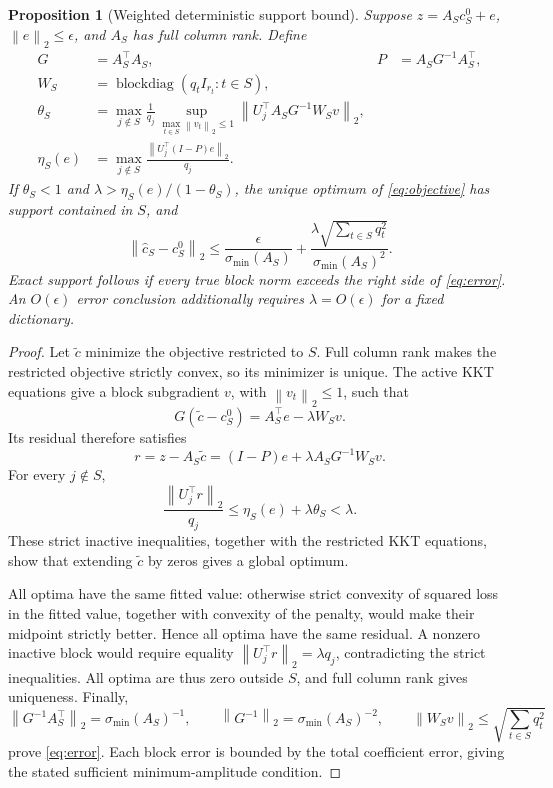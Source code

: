 \documentclass[11pt]{article}
\newtheorem{proposition}{Proposition}
\newcommand{\norm}[1]{\left\lVert#1\right\rVert}
\begin{document}
\newpage
\begin{proposition}[Weighted deterministic support bound]\label{prop:weighted}
Suppose $z=A_Sc_S^0+e$, $\norm{e}_2\leq\epsilon$, and $A_S$ has full column
rank. Define
\begin{align*}
 G&=A_S^\top A_S,& P&=A_SG^{-1}A_S^\top,\\
 W_S&=\operatorname{blockdiag}(q_tI_{r_t}:t\in S),\\
 \theta_S&=\max_{j\notin S}\frac1{q_j}
   \sup_{\max_{t\in S}\norm{v_t}_2\leq1}
     \norm{U_j^\top A_SG^{-1}W_Sv}_2,\\
 \eta_S(e)&=\max_{j\notin S}\frac{\norm{U_j^\top(I-P)e}_2}{q_j}.
\end{align*}
If $\theta_S<1$ and $\lambda>\eta_S(e)/(1-\theta_S)$, the unique optimum of
\eqref{eq:objective} has support contained in $S$, and
\begin{equation}\label{eq:error}
 \norm{\widehat c_S-c_S^0}_2
 \leq \frac{\epsilon}{\sigma_{\min}(A_S)}
 +\frac{\lambda\sqrt{\sum_{t\in S}q_t^2}}{\sigma_{\min}(A_S)^2}.
\end{equation}
Exact support follows if every true block norm exceeds the right side of
\eqref{eq:error}. An $O(\epsilon)$ error conclusion additionally requires
$\lambda=O(\epsilon)$ for a fixed dictionary.
\end{proposition}

\begin{proof}
Let $\widetilde c$ minimize the objective restricted to $S$. Full column rank
makes the restricted objective strictly convex, so its minimizer is unique.
The active KKT equations give a block subgradient $v$, with
$\norm{v_t}_2\leq1$, such that
\[
 G(\widetilde c-c_S^0)=A_S^\top e-\lambda W_Sv.
\]
Its residual therefore satisfies
\[
 r=z-A_S\widetilde c=(I-P)e+\lambda A_SG^{-1}W_Sv.
\]
For every $j\notin S$,
\[
 \frac{\norm{U_j^\top r}_2}{q_j}
 \leq\eta_S(e)+\lambda\theta_S<\lambda.
\]
These strict inactive inequalities, together with the restricted KKT equations,
show that extending $\widetilde c$ by zeros gives a global optimum.

All optima have the same fitted value: otherwise strict convexity of squared
loss in the fitted value, together with convexity of the penalty, would make
their midpoint strictly better. Hence all optima have the same residual.
A nonzero inactive block would require equality
$\norm{U_j^\top r}_2=\lambda q_j$, contradicting the strict inequalities.
All optima are thus zero outside $S$, and full column rank gives uniqueness.
Finally,
\[
 \norm{G^{-1}A_S^\top}_2=\sigma_{\min}(A_S)^{-1},\qquad
 \norm{G^{-1}}_2=\sigma_{\min}(A_S)^{-2},\qquad
 \norm{W_Sv}_2\leq\sqrt{\sum_{t\in S}q_t^2}
\]
prove \eqref{eq:error}. Each block error is bounded by the total coefficient
error, giving the stated sufficient minimum-amplitude condition.
\end{proof}
\end{document}
